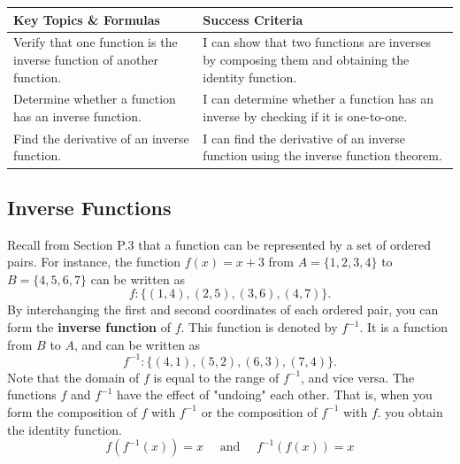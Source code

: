 \documentclass[12pt, letterpaper]{article}
\begin{document}
\begin{objectives}
    \renewcommand{\arraystretch}{1.5} %
    \begin{tabularx}{\textwidth}{@{} >{\raggedright\arraybackslash}X >{\raggedright\arraybackslash}X @{}}
        
        \textbf{Key Topics \& Formulas} & \textbf{Success Criteria} \\ 
        \midrule[1.5pt] %
        
        Verify that one function is the inverse function of another function.
        & I can show that two functions are inverses by composing them and obtaining the identity function. \\
        \midrule %
        
        Determine whether a function has an inverse function.
        & I can determine whether a function has an inverse by checking if it is one-to-one. \\
        \midrule

        Find the derivative of an inverse function.
        & I can find the derivative of an inverse function using the inverse function theorem.
    \end{tabularx}
\end{objectives}

\subsection{Inverse Functions}

Recall from Section P.3 that a function can be represented by a set of ordered pairs. For instance, the function $f(x)=x+3$ from $A=\{1,2,3,4\}$ to $B=\{4,5,6,7\}$ can be written as 
$$f: \{ (1,4),(2,5),(3,6),(4,7) \}.$$
By interchanging the first and second coordinates of each ordered pair, you can form
the \textbf{inverse function} of $f$. This function is denoted by $f^{-1}$. It is a function from $B$ to $A$, and can be written as 
$$f^{-1}: \{(4,1),(5,2),(6,3),(7,4)\}.$$
Note that the domain of $f$ is equal to the range of $f^{-1}$, and vice versa. The functions $f$ and $f^{-1}$ have the effect of "undoing" each other. That is, when you form the composition of $f$ with $f^{-1}$ or the composition of $f^{-1}$ with $f$. you obtain the identity function.
$$f(f^{-1}(x))=x \quad \text{ and } \quad f^{-1}(f(x))=x$$
\end{document}
